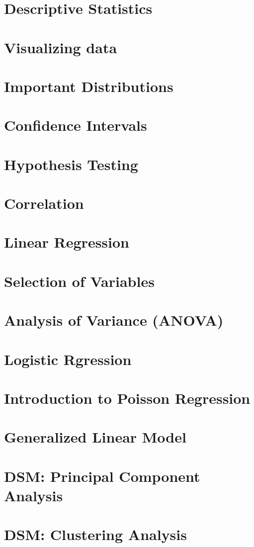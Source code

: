 \documentclass{article}
\begin{document}


\tableofcontents
\clearpage
{}
\setcounter{page}{1}

\section{Descriptive Statistics}

\section{Visualizing data}

\section{Important Distributions}

\section{Confidence Intervals}

\section{Hypothesis Testing}

\section{Correlation}

\section{Linear Regression}

\section{Selection of Variables}

\section{Analysis of Variance (ANOVA)}

\section{Logistic Rgression}

\section{Introduction to Poisson Regression}

\section{Generalized Linear Model}

\section{DSM: Principal Component Analysis}

\section{DSM: Clustering Analysis}


\clearpage
\end{document}
